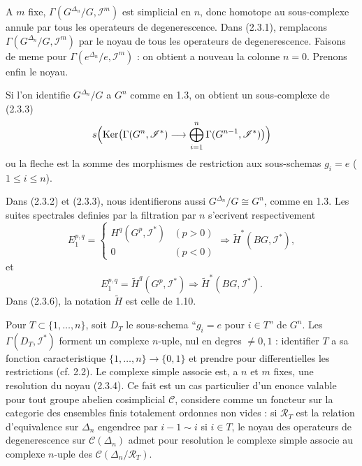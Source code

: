 \documentclass[11pt,a4paper]{article}
\theoremstyle{plain}
\theoremstyle{definition}
\DeclareMathOperator{\Ker}{Ker}
\begin{document}
A $m$ fixe, $\Gamma(G^{\Delta_n}/G, \mathscr{I}^m)$ est simplicial en $n$, donc homotope au sous-complexe annule par tous les operateurs de degenerescence. Dans (2.3.1), remplacons $\Gamma(G^{\Delta_n}/G, \mathscr{I}^m)$ par le noyau de tous les operateurs de degenerescence. Faisons de meme pour $\Gamma(e^{\Delta_n}/e, \mathscr{I}^m)$ : on obtient a nouveau la colonne $n = 0$. Prenons enfin le noyau.

Si l'on identifie $G^{\Delta_n}/G$ a $G^n$ comme en 1.3, on obtient un sous-complexe de (2.3.3)
\begin{equation}\label{2.3.4}
s\Bigl(\Ker\bigl(\Gamma(G^n, \mathscr{I}^*) \longrightarrow \bigoplus_{i=1}^n \Gamma(G^{n-1}, \mathscr{I}^*)\bigr)\Bigr)
\end{equation}
ou la fleche est la somme des morphismes de restriction aux sous-schemas $g_i = e$ ($1 \leq i \leq n$).

Dans (2.3.2) et (2.3.3), nous identifierons aussi $G^{\Delta_n}/G \cong G^n$, comme en 1.3. Les suites spectrales definies par la filtration par $n$ s'ecrivent respectivement
\begin{equation}\label{2.3.5}
E_1^{p,q} =
\begin{cases}
H^q(G^p, \mathscr{I}^*) & (p > 0) \\
0 & (p < 0)
\end{cases}
\Rightarrow \widetilde{H}^*(BG, \mathscr{I}^*),
\end{equation}
et
\begin{equation}\label{2.3.6}
E_1^{p,q} = \widetilde{H}^q(G^p, \mathscr{I}^*) \Rightarrow \widetilde{H}^*(BG, \mathscr{I}^*).
\end{equation}
Dans (2.3.6), la notation $\widetilde{H}$ est celle de 1.10.

Pour $T \subset \{1, \ldots, n\}$, soit $D_T$ le sous-schema ``$g_i = e$ pour $i \in T$'' de $G^n$. Les $\Gamma(D_T, \mathscr{I}^*)$ forment un complexe $n$-uple, nul en degres $\neq 0, 1$ : identifier $T$ a sa fonction caracteristique $\{1, \ldots, n\} \to \{0, 1\}$ et prendre pour differentielles les restrictions (cf. 2.2). Le complexe simple associe est, a $n$ et $m$ fixes, une resolution du noyau (2.3.4). Ce fait est un cas particulier d'un enonce valable pour tout groupe abelien cosimplicial $\mathscr{C}$, considere comme un foncteur sur la categorie des ensembles finis totalement ordonnes non vides : si $\mathscr{R}_T$ est la relation d'equivalence sur $\Delta_n$ engendree par $i - 1 \sim i$ si $i \in T$, le noyau des operateurs de degenerescence sur $\mathscr{C}(\Delta_n)$ admet pour resolution le complexe simple associe au complexe $n$-uple des $\mathscr{C}(\Delta_n/\mathscr{R}_T)$.
\end{document}
